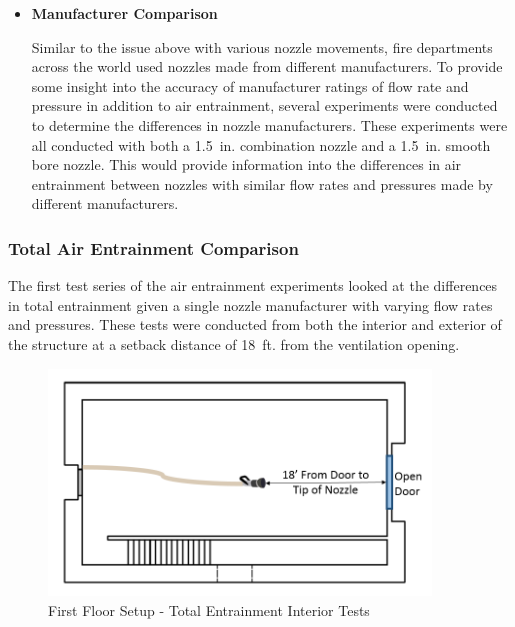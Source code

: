 \documentclass{article}
\begin{document}
\begin{itemize}
\vspace*{\baselineskip}

\item \bf{Manufacturer Comparison}
\normalfont
\vspace*{\baselineskip}

Similar to the issue above with various nozzle movements, fire departments across the world used nozzles made from different manufacturers. To provide some insight into the accuracy of manufacturer ratings of flow rate and pressure in addition to air entrainment, several experiments were conducted to determine the differences in nozzle manufacturers. These experiments were all conducted with both a 1.5~in. combination nozzle and a 1.5~in. smooth bore nozzle. This would provide information into the differences in air entrainment between nozzles with similar flow rates and pressures made by different manufacturers.

\vspace*{\baselineskip}

\end{itemize}

\clearpage

\subsubsection{Total Air Entrainment Comparison}

The first test series of the air entrainment experiments looked at the differences in total entrainment given a single nozzle manufacturer with varying flow rates and pressures. These tests were conducted from both the interior and exterior of the structure at a setback distance of 18~ft. from the ventilation opening. 

\begin{figure}[!ht]
	\centering
	\includegraphics[width=4in]{Figures/Air_Entrainment/Measurement_Locations_Firstfloor.png}
	\caption{First Floor Setup - Total Entrainment Interior Tests}
	\label{fig:First_Floor_Setup_Total_Entrainment_Interior_Tests}
\end{figure}
\end{document}
